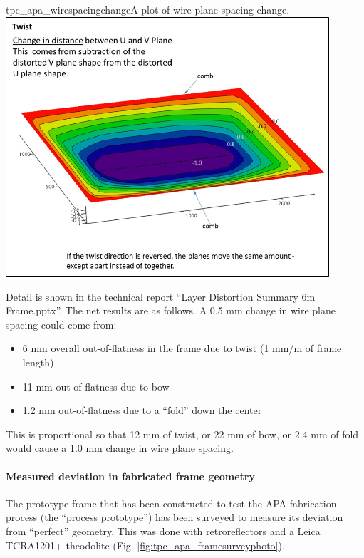 \begin{cdrfigure}{tpc_apa_wirespacingchange}{A plot of wire plane spacing change.}
\includegraphics[width=0.9\textwidth]{figures/tpc_apa_wirespacingchange.png} 
\end{cdrfigure}

Detail is shown in the technical report ``Layer Distortion Summary 6m Frame.pptx''.
The net results are as follows.  A 0.5 mm change in wire plane spacing could come from:
\begin{itemize}
\item{6 mm overall out-of-flatness in the frame due to twist (1 mm/m of frame length)}
\item{11 mm out-of-flatness due to bow}
\item{1.2 mm out-of-flatness due to a ``fold'' down the center}
\end{itemize}
    
This is proportional so that 12 mm of twist, or 22 mm of bow, or 2.4 mm of fold would cause a 1.0 mm change in wire plane spacing.

\paragraph{Measured deviation in fabricated frame geometry}

The prototype frame that has been constructed to test the APA fabrication process (the ``process  prototype'') has been surveyed to measure its deviation from ``perfect'' geometry.  This was done with retroreflectors and a Leica TCRA1201+ theodolite (Fig. \ref{fig:tpc_apa_framesurveyphoto}).

